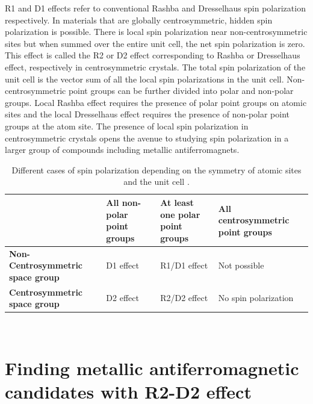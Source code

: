\documentclass[11pt,edeposit,draftthesis]{uiucthesis2020}
\begin{document}
\begin{mainmatter}
R1 and D1 effects refer to conventional Rashba and Dresselhaus spin polarization respectively. In materials that are globally centrosymmetric, hidden spin polarization is possible. There is local spin polarization near non-centrosymmetric sites but when summed over the entire unit cell, the net spin polarization is zero. This effect is called the R2 or D2 effect corresponding to Rashba or Dresselhaus effect, respectively in centrosymmetric crystals. The total spin polarization of the unit cell is the vector sum of all the local spin polarizations in the unit cell. Non-centrosymmetric point groups can be further divided into polar and non-polar groups. Local Rashba effect requires the presence of polar point groups on atomic sites and the local Dresselhaus effect requires the presence of non-polar point groups at the atom site. The presence of local spin polarization in centrosymmetric crystals opens the avenue to studying spin polarization in a larger group of compounds including metallic antiferromagnets.

\renewcommand{\arraystretch}{1.2}
\begin{table}
\caption{\label{tab:RD_effect} 
Different cases of spin polarization depending on the symmetry of atomic sites and the unit cell \cite{Zhang2014}.}
\centering
\begin{tabular}{>{\raggedright\arraybackslash}p{5cm}>{\raggedright\arraybackslash}p{3cm}>{\raggedright\arraybackslash}p{3cm}>{\raggedright\arraybackslash}p{3cm}}
\hline\hline
\textbf{} & \textbf{All non-polar point groups} & \textbf{At least one polar point groups} & \textbf{All centrosymmetric point groups}\\
\hline
\textbf{Non-Centrosymmetric space group} & D1 effect & R1/D1 effect & Not possible\\
\hline
\textbf{Centrosymmetric space group} & D2 effect & R2/D2 effect & No spin polarization\\
\hline\hline
\end{tabular}
~\\
\end{table}

\section{Finding metallic antiferromagnetic candidates with R2-D2 effect}


\end{mainmatter}
\end{document}
